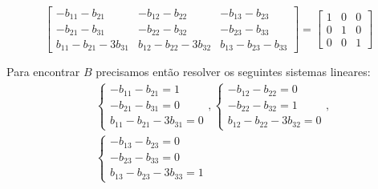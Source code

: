\documentclass{beamer}
\begin{document}
    \begin{frame}
        \[
            \begin{bmatrix}
                -b_{11} - b_{21} & -b_{12} - b_{22} & -b_{13} - b_{23}\\
                -b_{21} - b_{31} & -b_{22} - b_{32} & -b_{23} - b_{33}\\
                b_{11} - b_{21} - 3b_{31} & b_{12} - b_{22} - 3b_{32} & b_{13} - b_{23} - b_{33}
            \end{bmatrix} = \begin{bmatrix}
            1 & 0 & 0\\0 & 1 & 0\\0 & 0 & 1
            \end{bmatrix}
        \]

        Para encontrar $B$ precisamos então resolver os seguintes sistemas lineares:
        \begin{align*}
            &\begin{cases}
                -b_{11} - b_{21} = 1\\
                -b_{21} - b_{31} = 0\\
                b_{11} - b_{21} - 3b_{31} = 0
            \end{cases},
            \begin{cases}
                -b_{12} - b_{22} = 0\\
                -b_{22} - b_{32} = 1\\
                b_{12} - b_{22} - 3b_{32} = 0
            \end{cases},\\
            &\begin{cases}
                -b_{13} - b_{23} = 0\\
                -b_{23} - b_{33} = 0\\
                b_{13} - b_{23} - 3b_{33} = 1
            \end{cases}
        \end{align*}
    \end{frame}
\end{document}
